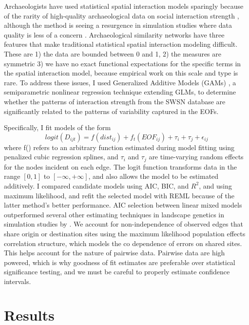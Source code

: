 \documentclass[10pt]{iopart}
\begin{document}
Archaeologists have used statistical spatial interaction models sparingly \parencite{Tobler1971,Hodder1974,Johnson1990ChumashAnalysis} because of the rarity of high-quality archaeological data on social interaction strength \parencite{plogg?}, although the method is seeing a resurgence in simulation studies where data quality is less of a concern \parencite{Bevan2013, Evans2011, Davies2014,Paliou2016}. Archaeological similarity networks have three features that make traditional statistical spatial interaction modeling difficult. These are 1) the data are bounded between 0 and 1, 2) the measures are symmetric 3) we have no exact functional expectations for the specific terms in the spatial interaction model, because empirical work on this scale and type is rare. To address these issues, I used Generalized Additive Models (GAMs) \parencite{Wood2006a}, a semiparametric nonlinear regression technique extending GLMs, to determine whether the patterns of interaction strength from the SWSN database are significantly related to the patterns of variability captured in the EOFs. 

Specifically, I fit models of the form
\begin{equation}
    logit\left(D_{ijt}\right) = f(dist_{ij}) + f_t(EOF_{ij}) + \tau_i + \tau_j + \epsilon_{ij}
\end{equation}
where f() refers to an arbitrary function estimated during model fitting using penalized cubic regression splines, and $\tau_i$ and $\tau_j$ are time-varying random effects for the nodes incident on each edge. The logit function transforms data in the range $[0, 1]$ to $[-\infty, +\infty]$, and also allows the model to be estimated additively. I compared candidate models using AIC, BIC, and $R^2$, and using maximum likelihood, and refit the selected model with REML because of the latter method's better performance. AIC selection between linear mixed models outperformed several other estimating techniques in landscape genetics in simulation studies by \parencite{Shirk2018}. We account for non-independence of observed edges that share origin or destination sites using the maximum likelihood population effects correlation structure, which models the co dependence of errors on shared sites. This helps account for the nature of pairwise data. Pairwise data are high powered, which is why goodness of fit estimates are preferable over statistical significance testing, and we must be careful to properly estimate confidence intervals. 

\section*{Results}
\end{document}
